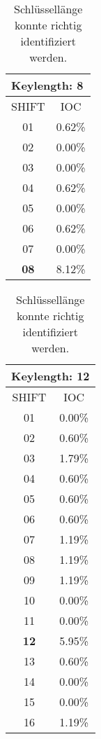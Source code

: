 \begin{table}[h]
    \begin{subtable}[t]{0.25\textwidth}
        \centering
        \begin{tabular}{c|c}
            \multicolumn{2}{l}{\textbf{Keylength: 8}}\\\hline
            SHIFT & IOC\\\hline
            01&      0.62\%\\
            02&      0.00\%\\
            03&      0.00\%\\
            04&      0.62\%\\
            05&      0.00\%\\
            06&      0.62\%\\
            07&      0.00\%\\
            \textbf{08}&      8.12\%
        \end{tabular}
        \caption{Schlüssellänge konnte richtig identifiziert werden.}
    \end{subtable}
    \hfill
    \begin{subtable}[h]{0.25\textwidth}
        \centering
        \begin{tabular}{c|c}
            \multicolumn{2}{l}{\textbf{Keylength: 12}}\\\hline
            SHIFT & IOC\\\hline
            01&      0.00\%\\
            02&      0.60\%\\
            03&      1.79\%\\
            04&      0.60\%\\
            05&      0.60\%\\
            06&      0.60\%\\
            07&      1.19\%\\
            08&      1.19\%\\
            09&      1.19\%\\
            10&      0.00\%\\
            11&      0.00\%\\
            \textbf{12}&      5.95\%\\
            13&      0.60\%\\
            14&      0.00\%\\
            15&      0.00\%\\
            16&      1.19\%\\

\end{tabular}
\end{subtable}
\end{table}
